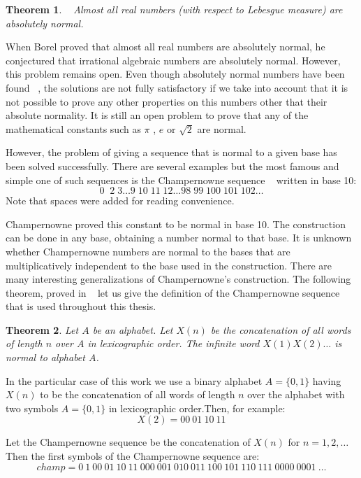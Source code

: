 \documentclass[11pt,a4paper]{tesis}
\newtheorem{theorem}{Theorem}[section]
\theoremstyle{definition}
\begin{document}
\begin{theorem} ~\cite{Borel}
    Almost all real numbers (with respect to Lebesgue measure) are absolutely normal.
\end{theorem}

When Borel proved that almost all real numbers are absolutely normal, he conjectured that irrational algebraic numbers are absolutely normal. However, this problem remains open.
Even though absolutely normal numbers have been found ~\cite{Sierpinski}, the solutions are not fully satisfactory if we take into account that it is not possible to prove any other properties on this numbers other that their absolute normality.
It is still an open problem to prove that any of the mathematical constants such as $\pi$ , $e$ or $\sqrt{2}$ are normal.

However, the problem of giving a sequence that is normal to a given base has been solved successfully. There are several examples but the most famous and simple one of such sequences is the Champernowne sequence ~\cite{champern} written in base 10:
$$0 \; \;2 \;3 \dots 9 \; 10 \; 11 \; 12 \dots 98 \; 99 \; 100 \; 101 \; 102 \dots$$ 
Note that spaces were added for reading convenience.


Champernowne proved this constant to be normal in base 10. The construction can be done in any base, obtaining a number normal to that base. It is unknown whether Champernowne numbers are normal to
the bases that are multiplicatively independent to the base used in the construction. There are many interesting generalizations of Champernowne's construction. The following theorem, proved in ~\cite{BC2018} let us give the definition of the Champernowne sequence that is used throughout this thesis.
\\

\begin{theorem}
    Let $A$ be an alphabet. Let $X(n)$ be the concatenation of all words of length $n$ over $A$ in lexicographic order.
     The infinite word $X(1)X(2)\dots$ is normal to alphabet $A$.
\end{theorem}

In the particular case of this work we use a binary alphabet  $A=\{0,1\}$ having $X(n)$ to be the concatenation of all words of length $n$ over the alphabet with two symbols $A=\{0,1\}$ in lexicographic order.Then, for example:
$$X(2) = 00 \: 01 \: 10 \: 11$$

Let the Champernowne sequence be the concatenation of $X(n)$ for $n = 1,2,\dots$ Then the first symbols of the Champernowne sequence are:
$$champ = 0 \: 1 \: 00 \: 01 \: 10 \: 11 \: 000 \: 001 \: 010 \: 011 \: 100 \: 101 \: 110 \: 111 \: 0000 \: 0001 \: \dots$$
\end{document}
